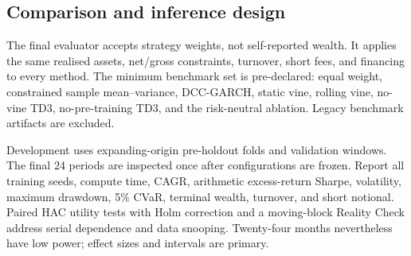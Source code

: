 \subsection{Comparison and inference design}

The final evaluator accepts strategy weights, not self-reported wealth. It
applies the same realised assets, net/gross constraints, turnover, short fees,
and financing to every method. The minimum benchmark set is pre-declared:
equal weight, constrained sample mean--variance, DCC-GARCH, static vine,
rolling vine, no-vine TD3, no-pre-training TD3, and the risk-neutral ablation.
Legacy benchmark artifacts are excluded.

Development uses expanding-origin pre-holdout folds and validation windows.
The final 24 periods are inspected once after configurations are frozen.
Report all training seeds, compute time, CAGR, arithmetic excess-return Sharpe,
volatility, maximum drawdown, 5\% CVaR, terminal wealth, turnover, and short
notional. Paired HAC utility tests with Holm correction and a moving-block
Reality Check address serial dependence and data snooping. Twenty-four months
nevertheless have low power; effect sizes and intervals are primary.

